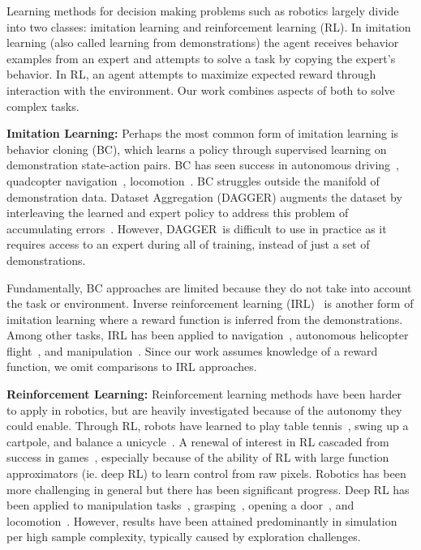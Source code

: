 Learning methods for decision making problems such as robotics largely divide into two classes:  imitation learning and reinforcement learning (RL).  In imitation learning (also called learning from demonstrations) the agent receives behavior examples from an expert and attempts to solve a task by copying the expert's behavior. In RL, an agent attempts to maximize expected reward through interaction with the environment. Our work combines aspects of both to solve complex tasks.

\textbf{Imitation Learning:} Perhaps the most common form of imitation learning is behavior cloning (BC), which learns a policy through supervised learning on demonstration state-action pairs.  BC has seen success in autonomous driving~\citep{pomerleau1989alvinn, bojarski2016nvidia}, quadcopter navigation~\citep{giusti15trails}, locomotion~\citep{nakanishi2004bipedlfd, kalakrishnan09terraintemplates}.
BC struggles outside the manifold of demonstration data. Dataset Aggregation (DA\scriptsize{GGER}\normalsize) augments the dataset by interleaving the learned and expert policy to address this problem of accumulating errors~\citep{ross2011dagger}. However, DA\scriptsize{GGER}\normalsize \, is difficult to use in practice as it requires access to an expert during all of training, instead of just a set of demonstrations.

Fundamentally, BC approaches are limited because they do not take into account the task or environment. Inverse reinforcement learning (IRL)~\citep{ng2000irl} is another form of imitation learning where a reward function is inferred from the demonstrations. Among other tasks, IRL has been applied to navigation~\citep{ziebart2008maxent}, autonomous helicopter flight~\citep{abbeel2004apprenticeship}, and manipulation~\citep{finn16guidedcostlearning}. Since our work assumes knowledge of a reward function, we omit comparisons to IRL approaches.

\textbf{Reinforcement Learning:} Reinforcement learning methods have been harder to apply in robotics, but are heavily investigated because of the autonomy they could enable. Through RL, robots have learned to play table tennis~\citep{peters2010reps}, swing up a cartpole, and balance a unicycle~\citep{deisenroth2011pilco}. A renewal of interest in RL cascaded from success in games~\citep{mnih2015human, Silver2016}, especially because of the ability of RL with large function approximators (ie. deep RL) to learn control from raw pixels. Robotics has been more challenging in general but there has been significant progress. Deep RL has been applied to manipulation tasks~\citep{LevineFDA15}, grasping~\citep{pinto2015supersizing, levine2016learning}, opening a door~\citep{Gu2016b}, and locomotion~\citep{lillicrap2015continuous, mnih2016asynchronous, schulman2015trpo}.  However, results have been attained predominantly in simulation per high sample complexity, typically caused by exploration challenges.

